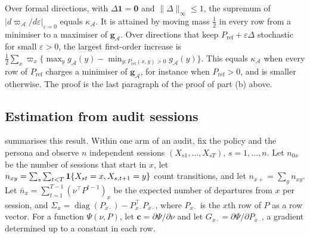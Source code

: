 \begin{remark}\label{rem:perturb-sharp}
Over formal directions, with $\Delta\bm1=\bm0$ and $\|\Delta\|_\infty\le1$, the supremum of $|d\varpi_{\mathcal A}/d\varepsilon|_{\varepsilon=0}$ equals $\kappa_{\mathcal A}$. It is attained by moving mass $\frac12$ in every row from a minimiser to a maximiser of $\bm g_{\mathcal A}$. Over directions that keep $P_{\mathrm{ref}}+\varepsilon\Delta$ stochastic for small $\varepsilon>0$, the largest first-order increase is $\frac12\sum_x\varpi_x\{\max_yg_{\mathcal A}(y)-\min_{y:P_{\mathrm{ref}}(x,y)>0}g_{\mathcal A}(y)\}$. This equals $\kappa_{\mathcal A}$ when every row of $P_{\mathrm{ref}}$ charges a minimiser of $\bm g_{\mathcal A}$, for instance when $P_{\mathrm{ref}}>0$, and is smaller otherwise.
The proof is the last paragraph of the proof of part (b) above.
\end{remark}

\subsection{Estimation from audit sessions}\label{app:markov-estimation}

 summarises this result. Within one arm of an audit, fix the policy and the persona and observe $n$ independent sessions $(X_{s1},\dots,X_{sT})$, $s=1,\dots,n$. Let $n_{0x}$ be the number of sessions that start in $x$, let $n_{xy}=\sum_s\sum_{t<T}\mathbf{1}\!\left\{X_{st}=x,X_{s,t+1}=y\right\}$ count transitions, and let $n_{x+}=\sum_yn_{xy}$. Let $\bar n_x=\sum_{t=1}^{T-1}(\nu^{\top}P^{t-1})_x$ be the expected number of departures from $x$ per session, and $\Sigma_x=\operatorname{diag}(P_{x\cdot})-P_{x\cdot}^{\top}P_{x\cdot}$, where $P_{x\cdot}$ is the $x$th row of $P$ as a row vector. For a function $\Psi(\nu,P)$, let $\bm c=\partial\Psi/\partial\nu$ and let $G_{x\cdot}=\partial\Psi/\partial P_{x\cdot}$, a gradient determined up to a constant in each row.

